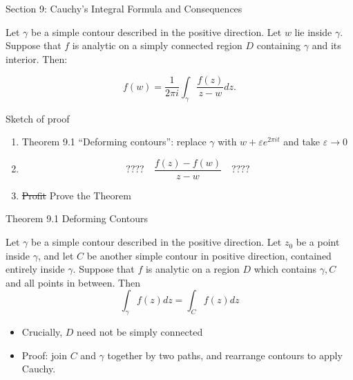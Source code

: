 \documentclass{beamer}
\begin{document}
\begin{frame}{Section 9: Cauchy's Integral Formula and Consequences}
\begin{theorem} Let $\gamma$ be a simple contour described in the positive direction.  Let $w$ lie inside $\gamma$.  Suppose that $f$ is analytic on a simply connected region $D$ containing $\gamma$ and its interior.  Then:

$$f(w)=\frac{1}{2\pi i} \int_\gamma\frac{f(z)}{z-w}dz.$$

\end{theorem}
\begin{block}{Sketch of proof}
\begin{enumerate}
    \item Theorem 9.1 ``Deforming contours'': replace $\gamma$ with $w+\varepsilon e^{2\pi i t}$ and take $\varepsilon\to 0$
    \item  $$????\quad\frac{f(z)-f(w)}{z-w}\quad????$$
    \item \sout{Profit} Prove the Theorem
\end{enumerate}
\end{block}

\end{frame}
\begin{frame}{Theorem 9.1 Deforming Contours}
\begin{theorem} Let $\gamma$ be a simple contour described in the positive direction.  Let $z_0$ be a point inside $\gamma$, and let $C$ be another simple contour in positive direction, contained entirely inside $\gamma$. Suppose that $f$ is analytic on a region $D$ which contains $\gamma, C$ and all points in between.  Then
$$\int_\gamma f(z)dz=\int_C f(z)dz$$
\end{theorem}
\begin{itemize}
    \item Crucially, $D$ need \alert{not} be simply connected
    \item Proof: join $C$ and $\gamma$ together by two paths, and rearrange contours to apply Cauchy.
\end{itemize}


\end{frame}
\end{document}
